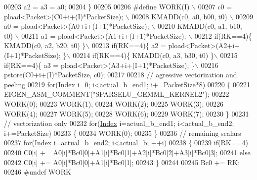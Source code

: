 \begin{DoxyCode}
00203           a2 = a3 = a0;
00204         \}
00205         
00206 \textcolor{preprocessor}{#define WORK(I) \(\backslash\)}
00207 \textcolor{preprocessor}{                   c0 = pload<Packet>(C0+i+(I)*PacketSize);     \(\backslash\)}
00208 \textcolor{preprocessor}{                   KMADD(c0, a0, b00, t0)                       \(\backslash\)}
00209 \textcolor{preprocessor}{                   a0 = pload<Packet>(A0+i+(I+1)*PacketSize);   \(\backslash\)}
00210 \textcolor{preprocessor}{                   KMADD(c0, a1, b10, t0)                       \(\backslash\)}
00211 \textcolor{preprocessor}{                   a1 = pload<Packet>(A1+i+(I+1)*PacketSize);   \(\backslash\)}
00212 \textcolor{preprocessor}{        if(RK==4)\{ KMADD(c0, a2, b20, t0)                      \}\(\backslash\)}
00213 \textcolor{preprocessor}{        if(RK==4)\{ a2 = pload<Packet>(A2+i+(I+1)*PacketSize);  \}\(\backslash\)}
00214 \textcolor{preprocessor}{        if(RK==4)\{ KMADD(c0, a3, b30, t0)                      \}\(\backslash\)}
00215 \textcolor{preprocessor}{        if(RK==4)\{ a3 = pload<Packet>(A3+i+(I+1)*PacketSize);  \}\(\backslash\)}
00216 \textcolor{preprocessor}{                   pstore(C0+i+(I)*PacketSize, c0);}
00217         
00218         \textcolor{comment}{// agressive vectorization and peeling}
00219         \textcolor{keywordflow}{for}(\hyperlink{namespace_eigen_a62e77e0933482dafde8fe197d9a2cfde}{Index} i=0; i<actual\_b\_end1; i+=PacketSize*8)
00220         \{
00221           EIGEN\_ASM\_COMMENT(\textcolor{stringliteral}{"SPARSELU\_GEMML\_KERNEL2"});
00222           WORK(0);
00223           WORK(1);
00224           WORK(2);
00225           WORK(3);
00226           WORK(4);
00227           WORK(5);
00228           WORK(6);
00229           WORK(7);
00230         \}
00231         \textcolor{comment}{// vectorization only}
00232         \textcolor{keywordflow}{for}(\hyperlink{namespace_eigen_a62e77e0933482dafde8fe197d9a2cfde}{Index} i=actual\_b\_end1; i<actual\_b\_end2; i+=PacketSize)
00233         \{
00234           WORK(0);
00235         \}
00236         \textcolor{comment}{// remaining scalars}
00237         \textcolor{keywordflow}{for}(\hyperlink{namespace_eigen_a62e77e0933482dafde8fe197d9a2cfde}{Index} i=actual\_b\_end2; i<actual\_b; ++i)
00238         \{
00239           \textcolor{keywordflow}{if}(RK==4) 
00240             C0[i] += A0[i]*Bc0[0]+A1[i]*Bc0[1]+A2[i]*Bc0[2]+A3[i]*Bc0[3];
00241           \textcolor{keywordflow}{else}
00242             C0[i] += A0[i]*Bc0[0]+A1[i]*Bc0[1];
00243         \}
00244         
00245         Bc0 += RK;
00246 \textcolor{preprocessor}{#undef WORK}

\end{DoxyCode}
